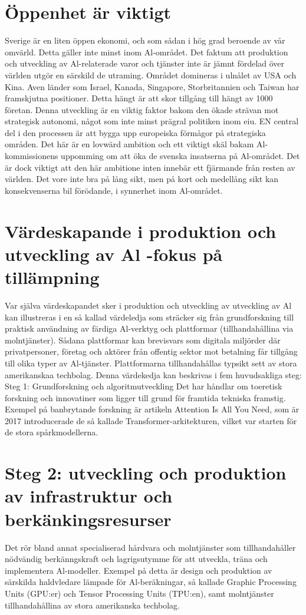 {{{{{{{{{{{{{\section*{Öppenhet är viktigt}
Sverige är en liten öppen ekonomi, och som sådan i hög grad beroende av vår omvärld. Detta gäller inte minst inom Al-området. Det faktum att produktion och utveckling av Al-relaterade varor och tjänster inte är jämnt fördelad över världen utgör en särskild de utraming. Området domineras i ulnålet av USA och Kina. Aven länder som Israel, Kanada, Singapore, Storbritannien och Taiwan har framskjutna positioner. Detta hängt är att skor tillgång till hängt av 1000 företan. Denna utveckling är en viktig faktor bakom den ökade strävan mot strategisk autonomi, något som inte minst prägral politiken inom eiu. EN central del i den processen är att bygga upp europeiska förmågor på strategiska områden. Det här är en lovwärd ambition och ett viktigt skäl bakam Al-kommissionens uppomming om att öka de svenska insatserna på Al-området. Det är dock viktigt att den här ambitione inten innebär ett fjärmande från resten av världen. Det vore inte bra på lång sikt, men på kort och medellång sikt kan konsekvenserna bil förödande, i synnerhet inom Al-området.
\section*{Värdeskapande i produktion och utveckling av Al -fokus på tillämpning}
Var själva värdeskapandet sker i produktion och utveckling av utveckling av Al kan illustreras i en så kallad värdeledja som sträcker sig från grundforskning till praktisk användning av färdiga Al-verktyg och plattformar (tillhandahållina via molntjänster). Sådana plattformar kan brevisvars som digitala miljörder där privatpersoner, företag och aktörer från offentig sektor mot betalning får tillgång till olika typer av Al-tjänster. Plattformarna tillhandahållas typsikt sett av stora amerikanskaa techbolag. Denna värdekedja kan beskrivas i fem huvudsakliga steg:
Steg 1: Grundforskning och algoritmutveckling Det har håndlar om toeretisk forskning och innovatiner som ligger till grund för framtida tekniska framstig. Exempel på banbrytande forskning är artikeln Attention Is All You Need, som är 2017 introducerade de så kallade Transformer-arkitekturen, vilket var starten för de stora spårkmodellerna. \({ }^{}\)
\section*{Steg 2: utveckling och produktion av infrastruktur och berkänkingsresurser}
Det rör bland annat specialiserad hårdvara och molntjänster som tillhandahåller nödvändig berkänngskraft och lagrigsutymme för att utveckla, träna och implementera Al-modeller. Exempel på detta är design och produktion av särskilda haldvledare lämpade för Al-beräkningar, så kallade Graphic Processing Units (GPU:er) och Tensor Processing Units (TPU:en), samt molntjänster tillhandahållina av stora amerikanska techbolag.
}}}}}}}}}}}}}
